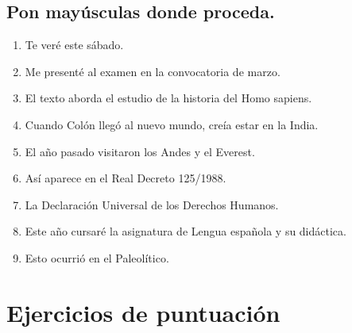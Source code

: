 \documentclass[12pt, a4paper, oneside]{report}
\newcommand\redsout{\bgroup\markoverwith{\textcolor{red}{\rule[0.5ex]{2pt}{0.4pt}}}\ULon}
\begin{document}
        \section{Pon mayúsculas donde proceda.}
            \renewcommand{\labelenumi}{\arabic{enumi})}
            \begin{enumerate}
                \item Te veré este sábado.
                \item Me presenté al examen en la convocatoria de marzo.
                \item El texto aborda el estudio de la historia del \redsout{h}\color{verde}H\color{negro}omo
                sapiens.
                \item Cuando Colón llegó al nuevo mundo, creía estar en la India.
                \item El año pasado visitaron los \redsout{a}\color{verde}A\color{negro}ndes y el
                \redsout{e}\color{verde}E\color{negro}verest.
                \item Así aparece en el \redsout{r}\color{verde}R\color{negro}eal
                \redsout{d}\color{verde}D\color{negro}ecreto 125/1988.
                \item La \redsout{d}\color{verde}D\color{negro}eclaración
                \redsout{u}\color{verde}U\color{negro}niversal de los
                \redsout{d}\color{verde}D\color{negro}erechos \redsout{h}\color{verde}H\color{negro}umanos.
                \item Este año cursaré la asignatura de \redsout{l}\color{verde}L\color{negro}engua española y su didáctica.
                \item Esto ocurrió en el \redsout{p}\color{verde}P\color{negro}aleolítico.
            \end{enumerate}

    \chapter*{Ejercicios de puntuación}
    \setcounter{chapter}{4}
    \setcounter{section}{0}
\end{document}

